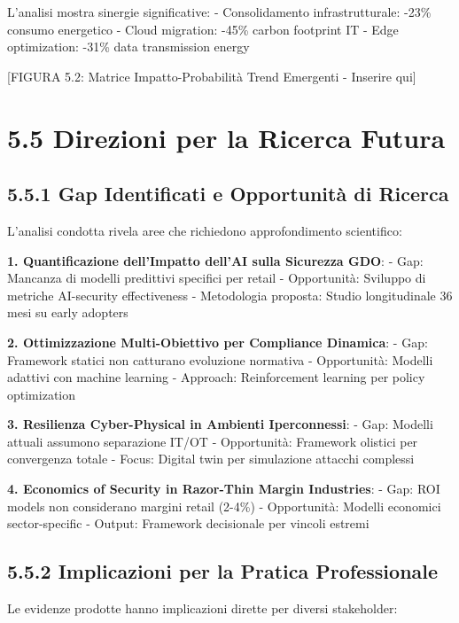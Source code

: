 \documentclass[12pt,a4paper,oneside]{book}
\numberwithin{figure}{chapter} %
\numberwithin{table}{chapter}  %
\begin{document}
L'analisi mostra sinergie significative: - Consolidamento
infrastrutturale: -23\% consumo energetico - Cloud migration: -45\%
carbon footprint IT - Edge optimization: -31\% data transmission energy

{[}FIGURA 5.2: Matrice Impatto-Probabilità Trend Emergenti - Inserire
qui{]}

\section{5.5 Direzioni per la Ricerca
Futura}\label{direzioni-per-la-ricerca-futura}

\subsection{5.5.1 Gap Identificati e Opportunità di
Ricerca}\label{gap-identificati-e-opportunituxe0-di-ricerca}

L'analisi condotta rivela aree che richiedono approfondimento
scientifico:

\textbf{1. Quantificazione dell'Impatto dell'AI sulla Sicurezza GDO}: -
Gap: Mancanza di modelli predittivi specifici per retail - Opportunità:
Sviluppo di metriche AI-security effectiveness - Metodologia proposta:
Studio longitudinale 36 mesi su early adopters

\textbf{2. Ottimizzazione Multi-Obiettivo per Compliance Dinamica}: -
Gap: Framework statici non catturano evoluzione normativa - Opportunità:
Modelli adattivi con machine learning - Approach: Reinforcement learning
per policy optimization

\textbf{3. Resilienza Cyber-Physical in Ambienti Iperconnessi}: - Gap:
Modelli attuali assumono separazione IT/OT - Opportunità: Framework
olistici per convergenza totale - Focus: Digital twin per simulazione
attacchi complessi

\textbf{4. Economics of Security in Razor-Thin Margin Industries}: -
Gap: ROI models non considerano margini retail (2-4\%) - Opportunità:
Modelli economici sector-specific - Output: Framework decisionale per
vincoli estremi

\subsection{5.5.2 Implicazioni per la Pratica
Professionale}\label{implicazioni-per-la-pratica-professionale}

Le evidenze prodotte hanno implicazioni dirette per diversi stakeholder:
\end{document}
